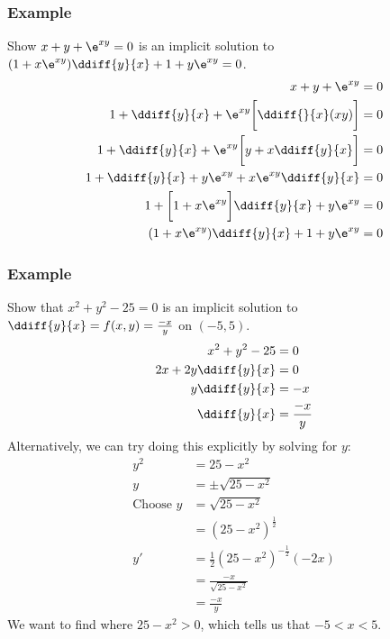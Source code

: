 \documentclass{math}
\begin{document}
\subsubsection*{Example}
Show \( x+y+\e^{xy} = 0 \) is an implicit solution to \( (1+x\e^{xy})
\ddiff{y}{x}+1+y\e^{xy} = 0 \).
\begin{align*}
  x+y+\e^{xy} &= 0 \\
  1+\ddiff{y}{x}+\e^{xy}\bigg[\ddiff{}{x}(xy)\bigg] &= 0 \\
  1+\ddiff{y}{x}+\e^{xy}\bigg[y+x\ddiff{y}{x}\bigg] &= 0 \\
  1+\ddiff{y}{x}+y\e^{xy}+x\e^{xy}\ddiff{y}{x} &= 0 \\
  1+\bigg[1+x\e^{xy}\bigg]\ddiff{y}{x}+y\e^{xy} &= 0 \\
  (1+x\e^{xy})\ddiff{y}{x}+1+y\e^{xy} &= 0
\end{align*}

\subsubsection*{Example}
Show that \( x^2+y^2-25 = 0 \) is an implicit solution to \( \ddiff{y}{x} =
f(x,y) = \frac{-x}{y} \) on \( (-5,5) \).
\begin{align*}
  x^2+y^2-25 &= 0 \\
  2x+2y\ddiff{y}{x} &= 0 \\
  y\ddiff{y}{x} &= -x \\
  \ddiff{y}{x} &= \frac{-x}{y}
\end{align*}
Alternatively, we can try doing this explicitly by solving for \( y \):
\begin{align*}
  y^2 &= 25-x^2 \\
  y &= \pm\sqrt{25-x^2} \\
  \text{Choose } y &= \sqrt{25-x^2} \\
  &= (25-x^2)^{\frac{1}{2}} \\
  y' &= \frac{1}{2}\left(25-x^2\right)^{-\frac{1}{2}}(-2x) \\
  &= \frac{-x}{\sqrt{25-x^2}} \\
  &= \frac{-x}{y}
\end{align*}
We want to find where \( 25-x^2 > 0 \), which tells us that \( -5 < x < 5 \).
\end{document}
